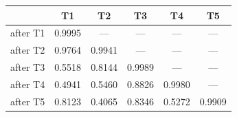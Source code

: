 \begin{tabular}{@{}lccccc@{}}
\toprule
& \textbf{T1} & \textbf{T2} & \textbf{T3} & \textbf{T4} & \textbf{T5} \\
\midrule
after T1 & 0.9995 & --- & --- & --- & --- \\
after T2 & 0.9764 & 0.9941 & --- & --- & --- \\
after T3 & 0.5518 & 0.8144 & 0.9989 & --- & --- \\
after T4 & 0.4941 & 0.5460 & 0.8826 & 0.9980 & --- \\
after T5 & 0.8123 & 0.4065 & 0.8346 & 0.5272 & 0.9909 \\
\bottomrule
\end{tabular}
